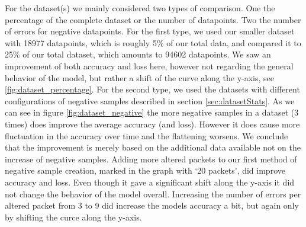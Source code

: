 \documentclass[
	ngerman,
	ruledheaders=section,%
	class=report,%
	thesis={type=bachelor},%
	accentcolor=9c,%
	custommargins=true,%
	marginpar=false,%
	parskip=half-,%
	fontsize=11pt,%
]{tudapub}
\begin{document}
For the dataset(s) we mainly considered two types of comparison.
One the percentage of the complete dataset or the number of datapoints.
Two the number of errors for negative datapoints.
For the first type, we used our smaller dataset with 18977 datapoints, which is roughly 5\% of our total data, and compared it to 25\% of our total dataset, which amounts to 94602 datapoints.
We saw an improvement of both accuracy and loss here, however not regarding the general behavior of the model, but rather a shift of the curve along the y-axis, see \ref{fig:dataset_percentage}.
For the second type, we used the datasets with different configurations of negative samples described in section \ref{sec:datasetStats}.
As we can see in figure \ref{fig:dataset_negative} the more negative samples in a dataset (3 times) does improve the average accuracy (and loss).
However it does cause more fluctuation in the accuracy over time and the flattening worsens.
We conclude that the improvement is merely based on the additional data available not on the increase of negative samples.
Adding more altered packets to our first method of negative sample creation, marked in the graph with `20 packets', did improve accuracy and loss.
Even though it gave a significant shift along the y-axis it did not change the behavior of the model overall.
Increasing the number of errors per altered packet from 3 to 9 did increase the models accuracy a bit, but again only by shifting the curce along the y-axis.
\end{document}
